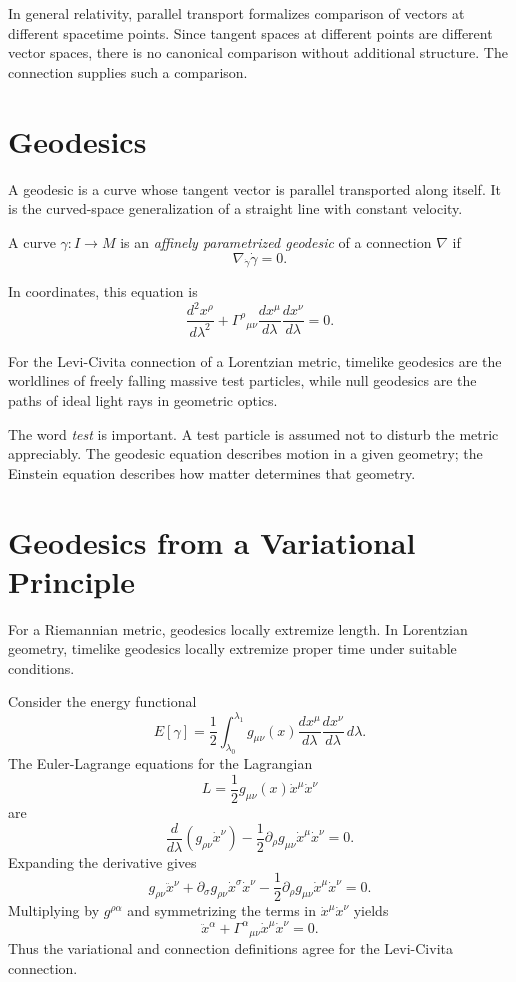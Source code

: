 In general relativity, parallel transport formalizes comparison of vectors at
different spacetime points. Since tangent spaces at different points are
different vector spaces, there is no canonical comparison without additional
structure. The connection supplies such a comparison.

\clearpage

\section{Geodesics}

A geodesic is a curve whose tangent vector is parallel transported along itself.
It is the curved-space generalization of a straight line with constant velocity.

\begin{definitionbox}
A curve \(\gamma:I\to M\) is an \emph{affinely parametrized geodesic} of a
connection \(\nabla\) if
\[
\nabla_{\dot{\gamma}}\dot{\gamma}=0.
\]
\end{definitionbox}

In coordinates, this equation is
\[
\boxed{
\frac{d^2x^\rho}{d\lambda^2}
+\Gamma^\rho{}_{\mu\nu}
\frac{dx^\mu}{d\lambda}
\frac{dx^\nu}{d\lambda}=0.
}
\]

For the Levi-Civita connection of a Lorentzian metric, timelike geodesics are
the worldlines of freely falling massive test particles, while null geodesics
are the paths of ideal light rays in geometric optics.

The word \emph{test} is important. A test particle is assumed not to disturb the
metric appreciably. The geodesic equation describes motion in a given geometry;
the Einstein equation describes how matter determines that geometry.

\clearpage

\section{Geodesics from a Variational Principle}

For a Riemannian metric, geodesics locally extremize length. In Lorentzian
geometry, timelike geodesics locally extremize proper time under suitable
conditions.

Consider the energy functional
\[
E[\gamma]=\frac{1}{2}\int_{\lambda_0}^{\lambda_1}
g_{\mu\nu}(x)
\frac{dx^\mu}{d\lambda}
\frac{dx^\nu}{d\lambda}\,d\lambda.
\]
The Euler-Lagrange equations for the Lagrangian
\[
L=\frac{1}{2}g_{\mu\nu}(x)\dot{x}^\mu\dot{x}^\nu
\]
are
\[
\frac{d}{d\lambda}\left(g_{\rho\nu}\dot{x}^\nu\right)
-\frac{1}{2}\partial_\rho g_{\mu\nu}\dot{x}^\mu\dot{x}^\nu=0.
\]
Expanding the derivative gives
\[
g_{\rho\nu}\ddot{x}^\nu
+\partial_\sigma g_{\rho\nu}\dot{x}^\sigma\dot{x}^\nu
-\frac{1}{2}\partial_\rho g_{\mu\nu}\dot{x}^\mu\dot{x}^\nu=0.
\]
Multiplying by \(g^{\rho\alpha}\) and symmetrizing the terms in
\(\dot{x}^\mu\dot{x}^\nu\) yields
\[
\ddot{x}^\alpha+\Gamma^\alpha{}_{\mu\nu}
\dot{x}^\mu\dot{x}^\nu=0.
\]
Thus the variational and connection definitions agree for the Levi-Civita
connection.

